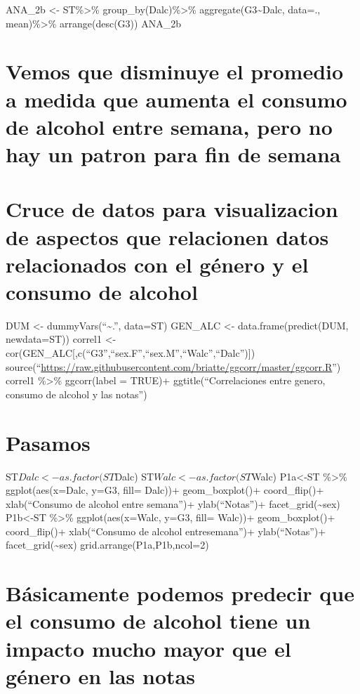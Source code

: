 \documentclass[]{article}
\begin{document}
ANA\_2b \textless{}- ST\%\textgreater{}\%
group\_by(Dalc)\%\textgreater{}\% aggregate(G3\textasciitilde{}Dalc,
data=., mean)\%\textgreater{}\% arrange(desc(G3)) ANA\_2b

\section{Vemos que disminuye el promedio a medida que aumenta el consumo
de alcohol entre semana, pero no hay un patron para fin de
semana}\label{vemos-que-disminuye-el-promedio-a-medida-que-aumenta-el-consumo-de-alcohol-entre-semana-pero-no-hay-un-patron-para-fin-de-semana}

\section{Cruce de datos para visualizacion de aspectos que relacionen
datos relacionados con el género y el consumo de
alcohol}\label{cruce-de-datos-para-visualizacion-de-aspectos-que-relacionen-datos-relacionados-con-el-genero-y-el-consumo-de-alcohol}

DUM \textless{}- dummyVars(``\textasciitilde{}.'', data=ST) GEN\_ALC
\textless{}- data.frame(predict(DUM, newdata=ST)) correl1
\textless{}-cor(GEN\_ALC{[},c(``G3'',``sex.F'',``sex.M'',``Walc'',``Dalc''){]})
source(``\url{https://raw.githubusercontent.com/briatte/ggcorr/master/ggcorr.R}'')
correl1 \%\textgreater{}\% ggcorr(label = TRUE)+ ggtitle(``Correlaciones
entre genero, consumo de alcohol y las notas'')

\section{Pasamos}\label{pasamos}

ST\(Dalc <- as.factor(ST\)Dalc) ST\(Walc <- as.factor(ST\)Walc)
P1a\textless{}-ST \%\textgreater{}\% ggplot(aes(x=Dalc, y=G3, fill=
Dalc))+ geom\_boxplot()+ coord\_flip()+ xlab(``Consumo de alcohol entre
semana'')+ ylab(``Notas'')+ facet\_grid(\textasciitilde{}sex)
P1b\textless{}-ST \%\textgreater{}\% ggplot(aes(x=Walc, y=G3, fill=
Walc))+ geom\_boxplot()+ coord\_flip()+ xlab(``Consumo de alcohol
entresemana'')+ ylab(``Notas'')+ facet\_grid(\textasciitilde{}sex)
grid.arrange(P1a,P1b,ncol=2)

\section{Básicamente podemos predecir que el consumo de alcohol tiene un
impacto mucho mayor que el género en las
notas}\label{basicamente-podemos-predecir-que-el-consumo-de-alcohol-tiene-un-impacto-mucho-mayor-que-el-genero-en-las-notas}
\end{document}
